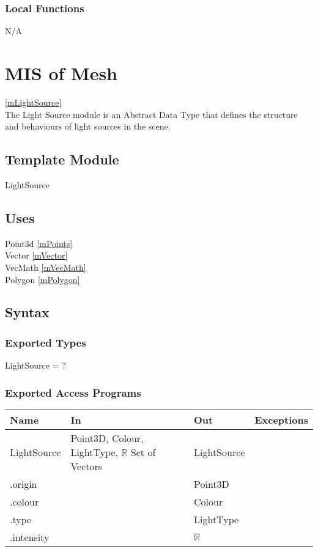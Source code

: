 \documentclass[12pt, titlepage]{article}
\begin{document}
\subsubsection{Local Functions}
N/A

\newpage

\section{MIS of Mesh} \ref{mLightSource} \\
The Light Source module is an Abstract Data Type that defines the structure and 
behaviours of light sources in the scene.
\subsection{Template Module}
LightSource

\subsection{Uses}
Point3d \ref{mPoints} \\
Vector \ref{mVector}\\
VecMath \ref{mVecMath}\\
Polygon \ref{mPolygon}\\

\subsection{Syntax}
\subsubsection{Exported Types}
LightSource = ?

\subsubsection{Exported Access Programs}
\begin{center}
	\begin{tabular}{p{4cm} p{2cm} p{2cm} p{4cm}}
		\hline
		\textbf{Name} & \textbf{In} & \textbf{Out} & \textbf{Exceptions} \\
		\hline
		LightSource & Point3D, Colour, LightType, $\mathbb{R}$ Set of Vectors & 
		LightSource & \\
		.origin & & Point3D & \\
		.colour & & Colour & \\
		.type & & LightType & \\
		.intensity & & $\mathbb{R}$ & \\
		\hline
	\end{tabular}
\end{center}
\end{document}
